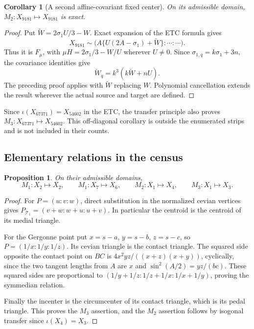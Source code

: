 \documentclass[11pt]{article}
\newtheorem{proposition}[theorem]{Proposition}
\newtheorem{corollary}[theorem]{Corollary}
\newcommand{\Cev}{\mathcal T_1}
\begin{document}
\begin{corollary}[A second affine-covariant fixed center]\label{cor:x9181}
On its admissible domain, $M_2:X_{9181}\mapsto X_{9181}$ is exact.
\end{corollary}
\begin{proof}
Put $\widetilde W=2\sigma_1U/3-W$.  Exact expansion of the ETC formula
gives
\[
 X_{9181}\sim
 \bigl(A\{U(2A-\sigma_1)+\widetilde W\}:\cdots:\cdots\bigr).
\]
Thus it is $F_\mu$, with $\mu H=2\sigma_1/3-W/U$ wherever $U\ne0$.
Since $\sigma_{1,q}=k\sigma_1+3n$, the covariance identities give
\[
 \widetilde W_q=k^3(k\widetilde W+nU).
\]
The preceding proof applies with $\widetilde W$ replacing $W$.
Polynomial cancellation extends the result wherever the actual source
and target are defined.
\end{proof}

Since $\iota(X_{67371})=X_{54602}$ in the ETC, the transfer principle also
proves $M_3:X_{67371}\mapsto X_{54602}$.  This off-diagonal corollary is
outside the enumerated strips and is not included in their counts.

\subsection{Elementary relations in the census}

\begin{proposition}\label{prop:elementary}
On their admissible domains,
\[
 M_1:X_2\mapsto X_2,\qquad M_1:X_7\mapsto X_6,\qquad
 M_2:X_1\mapsto X_4,\qquad M_3:X_1\mapsto X_3.
\]
\end{proposition}
\begin{proof}
For $P=(u:v:w)$, direct substitution in the normalized cevian vertices
gives $P_{\Cev}=(v+w:w+u:u+v)$.  In particular the centroid is the
centroid of its medial triangle.

For the Gergonne point put $x=s-a$, $y=s-b$, $z=s-c$, so
$P=(1/x:1/y:1/z)$.  Its cevian triangle is the contact triangle.
The squared side opposite the contact point on $BC$ is
$4x^2yz/((x+z)(x+y))$, cyclically, since the two tangent lengths from $A$
are $x$ and $\sin^2(A/2)=yz/(bc)$.  These squared sides are proportional
to $(1/y+1/z:1/z+1/x:1/x+1/y)$, proving the symmedian relation.

Finally the incenter is the circumcenter of its contact triangle, which
is its pedal triangle.  This proves the $M_3$ assertion, and the $M_2$
assertion follows by isogonal transfer since $\iota(X_4)=X_3$.
\end{proof}
\end{document}
